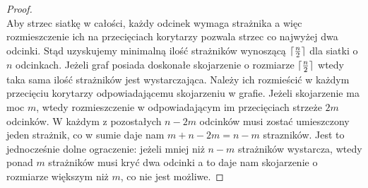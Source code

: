 \documentclass[brudnopis]{xmgr}
\DeclarePairedDelimiter\ceil{\lceil}{\rceil}
\theoremstyle{definition}
\begin{document}
\begin{proof}
 \\\indent Aby strzec siatkę w całości, każdy odcinek wymaga strażnika a więc rozmieszczenie ich na przecięciach korytarzy pozwala strzec co najwyżej dwa odcinki. Stąd uzyskujemy minimalną ilość strażników wynoszącą $\ceil{\frac{n}{2}}$ dla siatki o $n$ odcinkach. Jeżeli graf posiada doskonałe skojarzenie o rozmiarze $\ceil{\frac{n}{2}}$ wtedy taka sama ilość strażników jest wystarczająca. Należy ich rozmieścić w każdym przecięciu korytarzy odpowiadającemu skojarzeniu w grafie. Jeżeli skojarzenie ma moc $m$, wtedy rozmieszczenie w odpowiadającym im przecięciach strzeże $2m$ odcinków. W każdym z pozostałych $n - 2m$ odcinków musi zostać umieszczony jeden strażnik, co w sumie daje nam $m + n - 2m = n - m$ strazników. Jest to jednocześnie dolne ograczenie: jeżeli mniej niż $n - m$ strażników wystarcza, wtedy ponad $m$ strażników musi kryć dwa odcinki a to daje nam skojarzenie o rozmiarze większym niż $m$, co nie jest możliwe.
\end{proof}
\end{document}
